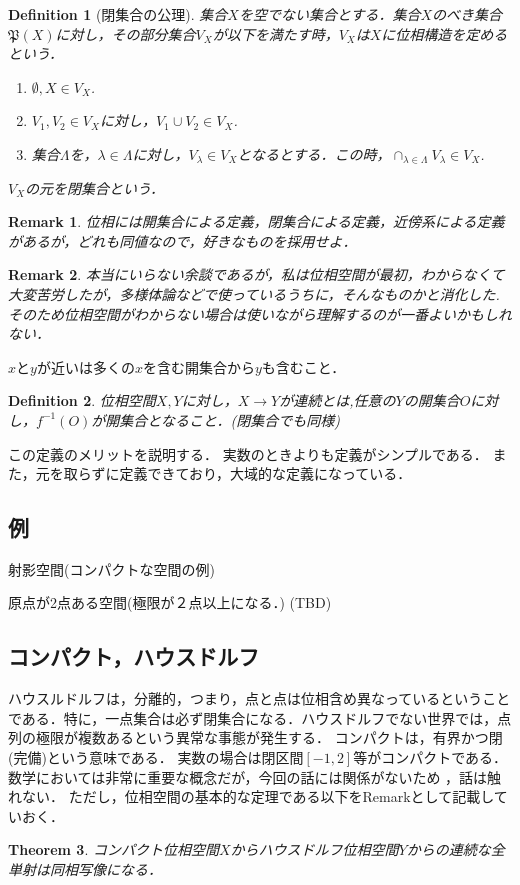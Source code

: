 \documentclass{ujarticle}
\newtheorem{thm}{Theorem}[section]
\newtheorem{dfn}[thm]{Definition}
\newtheorem*{rem}{Remark}
\begin{document}
\begin{dfn}[閉集合の公理]
 集合$X$を空でない集合とする．集合$X$のべき集合$\mathfrak{P}(X)$に対し，その部分集合$V_X$が以下を満たす時，$V_X$は$X$に位相構造を定めるという．
 \begin{enumerate}
   \item $\emptyset , X \in V_X$.
   \item $V_1,V_2 \in V_X$に対し，$V_1 \cup V_2 \in V_X$.
   \item 集合$\Lambda$を，$\lambda \in \Lambda$に対し，$V_{\lambda} \in V_X$となるとする．この時，$\displaystyle \cap_{\lambda \in \Lambda}V_{\lambda} \in V_X$.
 \end{enumerate}
 $V_X$の元を閉集合という．
\end{dfn}

\begin{rem}
位相には開集合による定義，閉集合による定義，近傍系による定義があるが，どれも同値なので，好きなものを採用せよ．
\end{rem}
\begin{rem}
 本当にいらない余談であるが，私は位相空間が最初，わからなくて大変苦労したが，多様体論などで使っているうちに，そんなものかと消化した.そのため位相空間がわからない場合は使いながら理解するのが一番よいかもしれない．
\end{rem}
$x$と$y$が近いは多くの$x$を含む開集合から$y$も含むこと．

\begin{dfn}
 位相空間$X,Y$に対し，$X \to Y$が連続とは,任意の$Y$の開集合$O$に対し，$f^{-1}(O)$が開集合となること．(閉集合でも同様)
\end{dfn}
この定義のメリットを説明する．
実数のときよりも定義がシンプルである．
また，元を取らずに定義できており，大域的な定義になっている．


\subsection{例}
\label{sub:例}

射影空間(コンパクトな空間の例)

原点が2点ある空間(極限が２点以上になる．)
(TBD)
\subsection{コンパクト，ハウスドルフ}
\label{sub:コンパクト，ハウスドルフ}
ハウスルドルフは，分離的，つまり，点と点は位相含め異なっているということである．特に，一点集合は必ず閉集合になる．ハウスドルフでない世界では，点列の極限が複数あるという異常な事態が発生する．
コンパクトは，有界かつ閉(完備)という意味である．
実数の場合は閉区間$[-1,2]$等がコンパクトである．
数学においては非常に重要な概念だが，今回の話には関係がないため
，話は触れない．
ただし，位相空間の基本的な定理である以下をRemarkとして記載していおく．
\begin{thm}
コンパクト位相空間$X$からハウスドルフ位相空間$Y$からの連続な全単射は同相写像になる．
\end{thm}
\end{document}
